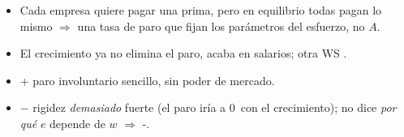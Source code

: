 \documentclass{article}
\begin{document}
\begin{columnas}
\begin{itemize}
  \begin{itemize}
  \item Cada empresa quiere pagar una prima, pero en equilibrio todas pagan lo mismo $\Rightarrow$ una tasa de paro que fijan los parámetros del esfuerzo, no $A$.
  \item El crecimiento ya no elimina el paro, acaba en salarios; otra WS .
  \end{itemize}
\end{itemize}
\begin{itemize}
\item + paro involuntario sencillo, sin poder de mercado.
\item $-$ rigidez \emph{demasiado} fuerte (el paro iría a 0~con el crecimiento); no dice \emph{por qué} $e$ depende de $w$ $\Rightarrow$ -.
\end{itemize}


\end{columnas}
\end{document}
